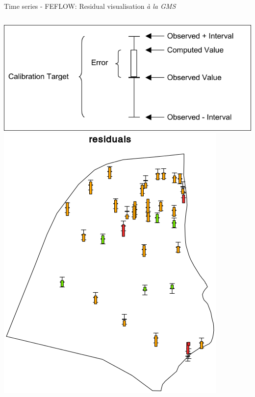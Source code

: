 \documentclass[8pt,ignorenonframetext,]{beamer}
\newcommand{\columnsbegin}{\begin{columns}}
\newcommand{\columnsend}{\end{columns}}
\begin{document}
\begin{frame}{Time series - FEFLOW: Residual visualisation \emph{à la
GMS}}

\columnsbegin
{} \includegraphics{imgPres/ts_residuals.png}
\includegraphics{imgPres/ts_resdiuals_examples.png} \columnsend

\end{frame}
\end{document}
